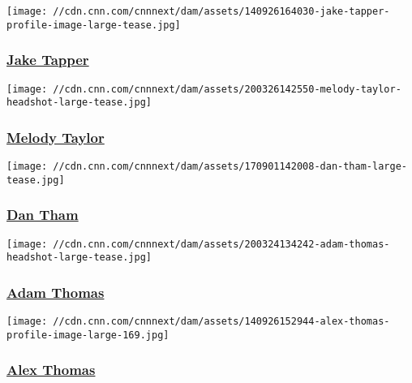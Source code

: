 \href{/profiles/jake-tapper-profile}{}

\texttt{[image: //cdn.cnn.com/cnnnext/dam/assets/140926164030-jake-tapper-profile-image-large-tease.jpg]}

\hypertarget{jake-tapper}{%
\subsubsection{\texorpdfstring{\href{/profiles/jake-tapper-profile}{Jake
Tapper}}{Jake Tapper}}\label{jake-tapper}}

\href{/profiles/melody-taylor}{}

\texttt{[image: //cdn.cnn.com/cnnnext/dam/assets/200326142550-melody-taylor-headshot-large-tease.jpg]}

\hypertarget{melody-taylor}{%
\subsubsection{\texorpdfstring{\href{/profiles/melody-taylor}{Melody
Taylor}}{Melody Taylor}}\label{melody-taylor}}

\href{/profiles/dan-tham-profile}{}

\texttt{[image: //cdn.cnn.com/cnnnext/dam/assets/170901142008-dan-tham-large-tease.jpg]}

\hypertarget{dan-tham}{%
\subsubsection{\texorpdfstring{\href{/profiles/dan-tham-profile}{Dan
Tham}}{Dan Tham}}\label{dan-tham}}

\href{/profiles/adam-thomas-profile}{}

\texttt{[image: //cdn.cnn.com/cnnnext/dam/assets/200324134242-adam-thomas-headshot-large-tease.jpg]}

\hypertarget{adam-thomas}{%
\subsubsection{\texorpdfstring{\href{/profiles/adam-thomas-profile}{Adam
Thomas}}{Adam Thomas}}\label{adam-thomas}}

\href{/profiles/alex-thomas}{}

\texttt{[image: //cdn.cnn.com/cnnnext/dam/assets/140926152944-alex-thomas-profile-image-large-169.jpg]}

\hypertarget{alex-thomas}{%
\subsubsection{\texorpdfstring{\href{/profiles/alex-thomas}{Alex
Thomas}}{Alex Thomas}}\label{alex-thomas}}

